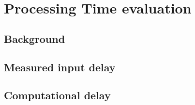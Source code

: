 \documentclass[ExampleMasters.tex]{subfiles}
\begin{document}
\clearpage
\chapter{Processing Time evaluation}
\section{Background}
\section{Measured input delay}
\section{Computational delay}
\end{document}
